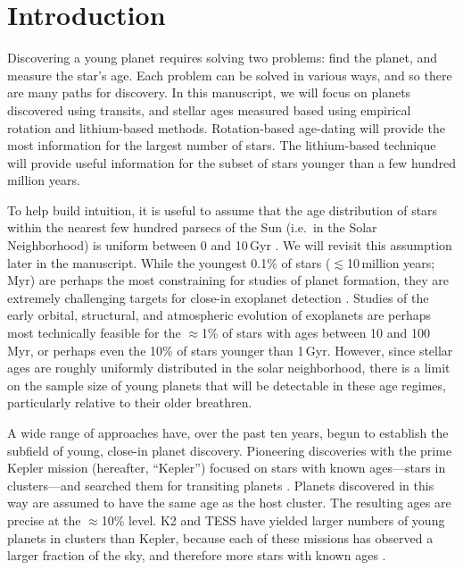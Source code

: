 \documentclass[11pt,twocolumn,tighten]{aastex63}
\begin{document}

\section{Introduction}
\label{sec:intro}

Discovering a young planet requires solving two problems: find the
planet, and measure the star's age.  Each problem can be solved in
various ways, and so there are many paths for discovery.  In this
manuscript, we will focus on planets discovered using transits, and
stellar ages measured based using empirical rotation and lithium-based
methods.  Rotation-based age-dating will provide the most information
for the largest number of stars.  The lithium-based technique will
provide useful information for the subset of stars younger than a few
hundred million years.

To help build intuition, it is useful to assume that the age
distribution of stars within the nearest few hundred parsecs of the
Sun (i.e.~in the Solar Neighborhood) is uniform between 0 and 10\,Gyr
\citep{Nordstrom_2004}.  We will revisit this assumption later in the
manuscript.  While the youngest 0.1\% of stars ($\lesssim$10\,million
years; Myr) are perhaps the most constraining for studies of planet
formation, they are extremely challenging targets for close-in
exoplanet detection 
\citep[see e.g.][]{Damasso_2020,Bouma_2020_ptfo,Donati_2020}.  Studies of
the early orbital, structural, and atmospheric evolution of exoplanets
are perhaps most technically feasible for the $\approx$1\% of stars
with ages between 10 and 100\,Myr, or perhaps even the 10\% of stars
younger than 1\,Gyr.  However, since stellar ages are roughly
uniformly distributed in the solar neighborhood, there is a limit on
the sample size of young planets that will be detectable in these age
regimes, particularly relative to their older breathren.

A wide range of approaches have, over the past ten years, begun to
establish the subfield of young, close-in planet discovery.
Pioneering discoveries with the prime Kepler mission (hereafter,
``Kepler'') focused on stars with known ages---stars in clusters---and
searched them for transiting planets \citep{Meibom_2013}.  Planets
discovered in this way are assumed to have the same age as the host
cluster.  The
resulting ages are precise at the $\approx$10\% level.  K2
and TESS have yielded larger numbers of young planets in clusters than
Kepler, because each of these missions has observed a larger fraction
of the sky, and therefore more stars with known ages
\citep[e.g.][]{Mann_K2_25_2016,Mann_2017,Curtis_2018,Livingston_2018,David_2019,Bouma_2020_toi837,Rizzuto_2020,Plavchan_2020,Newton_2021,Nardiello_2022,Tofflemire_2021,Zhou_2022,Zakhozhay_2022,Wood_2023}.
\end{document}
